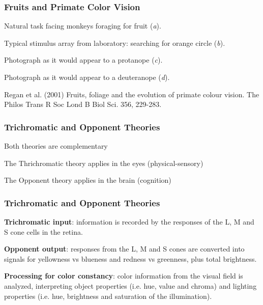 \documentclass[12pt]{beamer}\usepackage[]{graphicx}\usepackage[]{color}
\begin{document}

\begin{frame}
\frametitle{Fruits and Primate Color Vision}

\bbi
  \item Natural task facing monkeys foraging for fruit (\textit{a}).
  \item Typical stimulus array from laboratory: searching for orange circle (\textit{b}).
  \item Photograph as it would appear to a protanope (\textit{c}).
  \item Photograph as it would appear to a deuteranope (\textit{d}).
\ei

{\scriptsize {\lolit Regan et al. (2001) Fruits, foliage and the evolution of primate colour vision. The Philos Trans R Soc Lond B Biol Sci. 356, 229-283.}}

\end{frame}


\begin{frame}
\begin{center}
\Huge{}
\end{center}
\end{frame}


\begin{frame}
\frametitle{Trichromatic and Opponent Theories}

\bi
  \item Both theories are complementary
  \item The Thrichromatic theory applies in the eyes (physical-sensory)
  \item The Opponent theory applies in the brain (cognition)
\ei

\end{frame}


\begin{frame}
\frametitle{Trichromatic and Opponent Theories}

\bbi
  \item \textbf{Trichromatic input}: information is recorded by the responses of 
  the L, M and S cone cells in the retina.
  \item \textbf{Opponent output}: responses from the L, M and S cones are converted 
  into signals for yellowness vs blueness and redness vs greenness, plus total brightness.
  \item \textbf{Processing for color constancy}: color information from the visual field is analyzed, interpreting object properties (i.e. hue, value and chroma) and lighting properties (i.e. hue, brightness and saturation of the illumination).
\ei
\eb

\end{frame}
\end{document}
